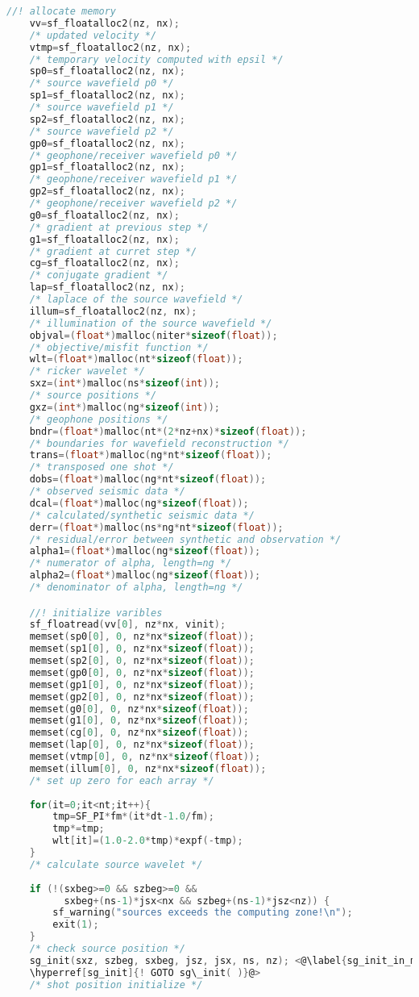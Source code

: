 \documentclass[a4paper,11pt]{article}
\theoremstyle{mytheor}
\begin{document}
\begin{lstlisting}[label={main},language=C,tabsize=4,caption=main()]
	//! allocate memory
	vv=sf_floatalloc2(nz, nx);
	/* updated velocity */
	vtmp=sf_floatalloc2(nz, nx);
	/* temporary velocity computed with epsil */
	sp0=sf_floatalloc2(nz, nx);
	/* source wavefield p0 */
	sp1=sf_floatalloc2(nz, nx);
	/* source wavefield p1 */
	sp2=sf_floatalloc2(nz, nx);
	/* source wavefield p2 */
	gp0=sf_floatalloc2(nz, nx);
	/* geophone/receiver wavefield p0 */
	gp1=sf_floatalloc2(nz, nx);
	/* geophone/receiver wavefield p1 */
	gp2=sf_floatalloc2(nz, nx);
	/* geophone/receiver wavefield p2 */
	g0=sf_floatalloc2(nz, nx);
	/* gradient at previous step */
	g1=sf_floatalloc2(nz, nx);
	/* gradient at curret step */
	cg=sf_floatalloc2(nz, nx);
	/* conjugate gradient */
	lap=sf_floatalloc2(nz, nx);
	/* laplace of the source wavefield */
	illum=sf_floatalloc2(nz, nx);
	/* illumination of the source wavefield */
	objval=(float*)malloc(niter*sizeof(float));
	/* objective/misfit function */
	wlt=(float*)malloc(nt*sizeof(float));
	/* ricker wavelet */
	sxz=(int*)malloc(ns*sizeof(int)); 
	/* source positions */
	gxz=(int*)malloc(ng*sizeof(int)); 
	/* geophone positions */
	bndr=(float*)malloc(nt*(2*nz+nx)*sizeof(float));
	/* boundaries for wavefield reconstruction */
	trans=(float*)malloc(ng*nt*sizeof(float));
	/* transposed one shot */
	dobs=(float*)malloc(ng*nt*sizeof(float));
	/* observed seismic data */
	dcal=(float*)malloc(ng*sizeof(float));	
	/* calculated/synthetic seismic data */
	derr=(float*)malloc(ns*ng*nt*sizeof(float));
	/* residual/error between synthetic and observation */
	alpha1=(float*)malloc(ng*sizeof(float));
	/* numerator of alpha, length=ng */
	alpha2=(float*)malloc(ng*sizeof(float));
	/* denominator of alpha, length=ng */

	//! initialize varibles
	sf_floatread(vv[0], nz*nx, vinit);
	memset(sp0[0], 0, nz*nx*sizeof(float));
	memset(sp1[0], 0, nz*nx*sizeof(float));
	memset(sp2[0], 0, nz*nx*sizeof(float));
	memset(gp0[0], 0, nz*nx*sizeof(float));
	memset(gp1[0], 0, nz*nx*sizeof(float));
	memset(gp2[0], 0, nz*nx*sizeof(float));
	memset(g0[0], 0, nz*nx*sizeof(float));
	memset(g1[0], 0, nz*nx*sizeof(float));
	memset(cg[0], 0, nz*nx*sizeof(float));
	memset(lap[0], 0, nz*nx*sizeof(float));
	memset(vtmp[0], 0, nz*nx*sizeof(float));
	memset(illum[0], 0, nz*nx*sizeof(float));
	/* set up zero for each array */
	
	for(it=0;it<nt;it++){
		tmp=SF_PI*fm*(it*dt-1.0/fm);
		tmp*=tmp;
		wlt[it]=(1.0-2.0*tmp)*expf(-tmp);
	}
	/* calculate source wavelet */
	
	if (!(sxbeg>=0 && szbeg>=0 && 
	      sxbeg+(ns-1)*jsx<nx && szbeg+(ns-1)*jsz<nz)) {
		sf_warning("sources exceeds the computing zone!\n"); 
		exit(1);
	}
	/* check source position */
	sg_init(sxz, szbeg, sxbeg, jsz, jsx, ns, nz); <@\label{sg_init_in_main}
	\hyperref[sg_init]{! GOTO sg\_init( )}@>
	/* shot position initialize */
	

\end{lstlisting}
\end{document}
